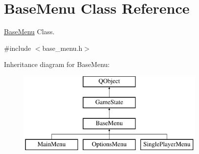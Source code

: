 \hypertarget{class_base_menu}{\section{Base\-Menu Class Reference}
\label{class_base_menu}
}


\hyperlink{class_base_menu}{Base\-Menu} Class.  




{\ttfamily \#include $<$base\-\_\-menu.\-h$>$}

Inheritance diagram for Base\-Menu\-:\begin{figure}[H]
\begin{center}
\leavevmode
\includegraphics[height=4.000000cm]{class_base_menu}
\end{center}
\end{figure}
